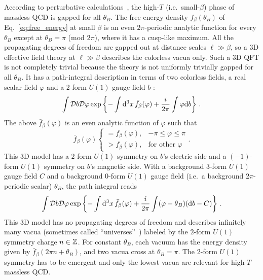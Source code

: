 \documentclass[
 reprint,







nofootinbib,


 amsmath,amssymb,
 aps,
 prd






tightenlines
]{revtex4-2}
\begin{document}
According to perturbative calculations~\cite{KapustaGale201102, Roberge:1986mm}, the high-$T$ (i.e.~small-$\beta$) phase of massless QCD is gapped for all $\theta_B$.
The free energy density $f_{\beta}(\theta_B)$ of Eq.~\eqref{eq:free_energy} at small $\beta$ is an even $2\pi$-periodic analytic function for every $\theta_B$ except at $\theta_B=\pi$ (mod $2\pi$), where it has a cusp-like maximum.
All the propagating degrees of freedom are gapped out at distance scales $\ell \gg \beta$, so a 3D effective field theory at $\ell \gg \beta$ describes the colorless vacua only.
Such a 3D QFT is not completely trivial because the theory is not uniformly trivially gapped for all $\theta_B$.
It has a path-integral description in terms of two colorless fields, a real scalar field $\varphi$ and a 2-form $U(1)$ gauge field $b$ \cite{Kallosh:1995hi,Gabadadze:1999na,Gabadadze:2000vw,Gabadadze:2002ff,Dvali:2005an,Burgess:2023ifd}:
\begin{equation}\label{eq:high_T_EFT}
    \int\mathcal{D} b\mathcal{D}\varphi \exp\left\{ -\int\mathrm{d}^3x\,
    \bar{f}_{\beta}(\varphi) + \frac{i}{2\pi} \int\varphi\mathrm{d} b\right\}\,.
\end{equation}
The above $\bar{f}_{\beta}(\varphi)$ is an even analytic function of $\varphi$ such that
\begin{equation}
    \bar{f}_{\beta}(\varphi)
    \begin{cases}
        = f_{\beta}(\varphi), & -\pi\le\varphi\le\pi \\
        > f_{\beta}(\varphi), & \text{for other }\varphi
    \end{cases}.
\end{equation}
This 3D model has a $2$-form $U(1)$ symmetry on $b$'s electric side and a $(-1)$-form $U(1)$ symmetry on $b$'s magnetic side.
With a background $3$-form $U(1)$ gauge field $C$ and a background $0$-form $U(1)$ gauge field (i.e.~a background $2\pi$-periodic scalar) $\theta_B$, the path integral reads
\begin{equation}\label{eq:high_T_EFT_background}
    \int\mathcal{D} b\mathcal{D}\varphi \exp\left\{ -\int\mathrm{d}^3x\,
    \bar{f}_{\beta}(\varphi) + \frac{i}{2\pi} \int (\varphi - \theta_B)(\mathrm{d} b-C)\right\}\,.
\end{equation}
This 3D model has no propagating degrees of freedom and describes infinitely many vacua (sometimes called ``universes''~\cite{Hellerman:2006zs,Sharpe:2014tca,Tanizaki:2019rbk,Komargodski:2020mxz,Cherman:2020cvw,Lin:2025oml,Sharpe:2022ene}) labeled by the $2$-form $U(1)$ symmetry charge $n\in\mathbb{Z}$.
For constant $\theta_B$, each vacuum has the energy density given by $\bar{f}_{\beta}(2\pi n + \theta_B)$, and two vacua cross at $\theta_B=\pi$.
The $2$-form $U(1)$ symmetry has to be emergent and only the lowest vacua are relevant for high-$T$ massless QCD.
\end{document}
